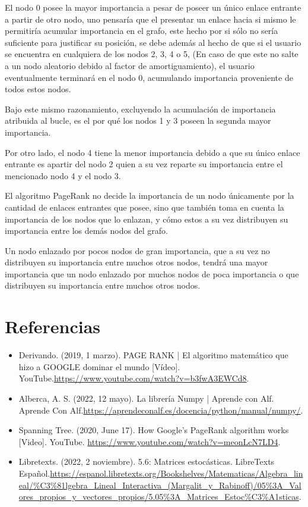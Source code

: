 \documentclass[12pt]{article}
\begin{document}
            El nodo 0 posee la mayor importancia a pesar de poseer un único enlace entrante a partir de otro nodo, uno pensaría que el presentar un enlace hacia si mismo le permitiría acumular importancia en el grafo, este hecho por si sólo no sería suficiente para justificar su posición, se debe además al hecho de que si el usuario se encuentra en cualquiera de los nodos 2, 3, 4 o 5, (En caso de que este no salte a un nodo aleatorio debido al factor de amortiguamiento), el usuario eventualmente terminará en el nodo 0, acumulando importancia proveniente de todos estos nodos.
            
            Bajo este mismo razonamiento, excluyendo la acumulación de importancia atribuida al bucle, es el por qué los nodos 1 y 3 poseen la segunda mayor importancia. 
            
            Por otro lado, el nodo 4 tiene la menor importancia debido a que su único enlace entrante es apartir del nodo 2 quien a su vez reparte su importancia entre el mencionado nodo 4 y el nodo 3.

        El algoritmo PageRank no decide la importancia de un nodo únicamente por la cantidad de enlaces entrantes que posee, sino que también toma en cuenta la importancia de los nodos que lo enlazan, y cómo estos a su vez distribuyen su importancia entre los demás nodos del grafo.

        Un nodo enlazado por pocos nodos de gran importancia, que a su vez no distribuyen su importancia entre muchos otros nodos, tendrá una mayor importancia que un nodo enlazado por muchos nodos de poca importancia o que distribuyen su importancia entre muchos otros nodos.

    \newpage
    \section{Referencias}
    \begin{itemize}
        \item Derivando. (2019, 1 marzo). PAGE RANK | El algoritmo matemático que hizo a GOOGLE dominar el mundo [Vídeo]. YouTube.\newline \url{https://www.youtube.com/watch?v=b3fwA3EWCd8}.
        \item Alberca, A. S. (2022, 12 mayo). La librería Numpy | Aprende con Alf. Aprende Con Alf.\newline \url{https://aprendeconalf.es/docencia/python/manual/numpy/}.
        \item Spanning Tree. (2020, June 17). How Google’s PageRank algorithm works [Video]. YouTube. \newline \url{ https://www.youtube.com/watch?v=meonLcN7LD4}.
        \item Libretexts. (2022, 2 noviembre). 5.6: Matrices estocásticas. LibreTexts Español.\newline \url{https://espanol.libretexts.org/Bookshelves/Matematicas/Algebra_lineal/%C3%81lgebra_Lineal_Interactiva_(Margalit_y_Rabinoff)/05%3A_Valores_propios_y_vectores_propios/5.05%3A_Matrices_Estoc%C3%A1sticas}.
    \end{itemize}
\end{document}
